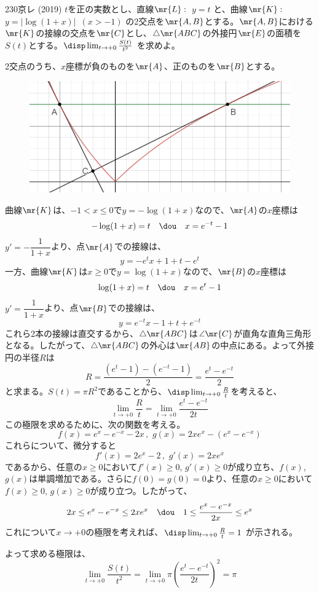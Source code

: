 \begin{thm}{230}{}{京レ (2019)}
 $t$を正の実数とし、直線$\mr{L}:$~$y=t$ と、曲線$\mr{K}:$~$y=\left|\log (1+x)\right|$~$(x>-1)$ の2交点を$\mr{A, B}$とする。$\mr{A, B}$における$\mr{K}$の接線の交点を$\mr{C}$とし、$\triangle\mr{ABC}$の外接円$\mr{E}$の面積を$S(t)$とする。$\disp \lim_{t\to +0} \frac{S(t)}{t^2}$ を求めよ。
\end{thm}

2交点のうち、$x$座標が負のものを$\mr{A}$、正のものを$\mr{B}$とする。
\begin{figure}[H]
 \centering
 \includegraphics[width=0.8\linewidth]{../problems/Q_230/A_230.png}
\end{figure}

曲線$\mr{K}$は、$-1<x\le 0$で$y=-\log(1+x)$なので、$\mr{A}$の$x$座標は
\[ -\log(1+x)=t \quad\dou\quad x=e^{-t}-1 \]
$y'=-\dfrac{1}{1+x}$より、点$\mr{A}$での接線は、
\[ y=-e^tx+1+t-e^t \]
一方、曲線$\mr{K}$は$x\ge 0$で$y=\log(1+x)$なので、$\mr{B}$の$x$座標は
\[ \log(1+x)=t \quad\dou\quad x=e^t-1 \]
$y'=\dfrac{1}{1+x}$より、点$\mr{B}$での接線は、
\[ y=e^{-t}x-1+t+e^{-t} \]
これら2本の接線は直交するから、$\triangle\mr{ABC}$は$\angle\mr{C}$が直角な直角三角形となる。したがって、$\triangle\mr{ABC}$の外心は$\mr{AB}$の中点にある。よって外接円の半径$R$は
\[ R=\frac{(e^t-1)-(e^{-t}-1)}{2}=\frac{e^t-e^{-t}}{2} \]
と求まる。$S(t)=\pi R^2$であることから、$\disp \lim_{t\to +0}\frac{R}{t}$を考えると、
\[  \lim_{t\to +0} \frac{R}{t} = \lim_{t\to +0} \frac{e^t-e^{-t}}{2t} \]
この極限を求めるために、次の関数を考える。
\[ f(x)=e^x-e^{-x}-2x \,,\,\, g(x)=2xe^x-(e^x-e^{-x}) \]
これらについて、微分すると
\[ f'(x)=2e^x-2 \,,\,\, g'(x)=2xe^x \]
であるから、任意の$x\ge 0$において$f'(x)\ge 0$, $g'(x)\ge 0$が成り立ち、$f(x)$, $g(x)$は単調増加である。さらに$f(0)=g(0)=0$より、任意の$x\ge 0$において$f(x)\ge 0$, $g(x)\ge 0$が成り立つ。したがって、
\[ 2x \le e^x-e^{-x}\le 2xe^x \quad\dou\quad 1\le \frac{e^x-e^{-x}}{2x}\le e^x \]
これについて$x\to +0$の極限を考えれば、$\disp \lim_{t\to +0} \frac{R}{t}=1$ が示される。

よって求める極限は、
\[ \lim_{t\to +0} \frac{S(t)}{t^2}=\lim_{t\to +0} \pi\left(\frac{e^t-e^{-t}}{2t}\right)^2 = \pi \]
